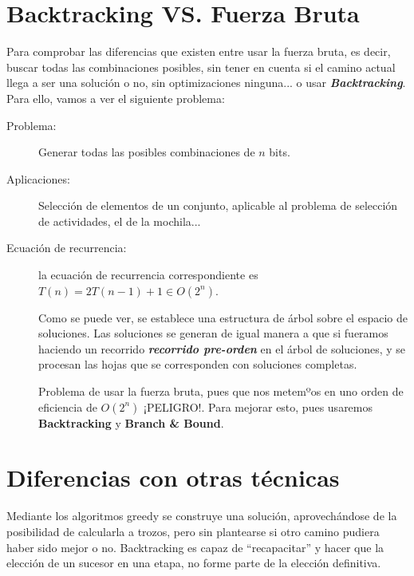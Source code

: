 \documentclass[10pt,a4paper,spanish]{report}
\theoremstyle{definition}
\theoremstyle{remark}
\begin{document}
\section{\textcolor{electricgreen}Backtracking VS. Fuerza Bruta}

Para comprobar las diferencias que existen entre usar la fuerza bruta, es decir, buscar todas las combinaciones posibles, sin tener en cuenta si el camino actual llega a ser una solución o no, sin optimizaciones ninguna... o usar \textbf{\textit{\textcolor{electricgreen}{Backtracking}}}. Para ello, vamos a ver el siguiente problema:

\begin{description}
    \item [Problema:] Generar todas las posibles combinaciones de $n$ bits.
    \item [Aplicaciones:] Selección de elementos de un conjunto, aplicable al problema de selección de actividades, el de la mochila...
    \item [Ecuación de recurrencia:] la ecuación de recurrencia correspondiente es $T(n)=2T(n-1)+1 \in O(2^n)$.
    \begin{center}
        
    \end{center}

    Como se puede ver, se establece una estructura de árbol sobre el espacio de soluciones. Las soluciones se generan de igual manera a que si fueramos haciendo un recorrido \textit{\textbf{\textcolor{electricgreen}{recorrido pre-orden}}} en el árbol de soluciones, y se procesan las hojas que se corresponden con soluciones completas.

    Problema de usar la fuerza bruta, pues que nos metemºos en uno orden de eficiencia de $O(2^n)$ ¡PELIGRO!. Para mejorar esto, pues usaremos \textbf{\textcolor{electricgreen}{Backtracking}} y \textbf{\textcolor{electricgreen}{Branch \& Bound}}.
\end{description}

\section{\textcolor{electricgreen}Diferencias con otras técnicas}

Mediante los algoritmos greedy se construye una solución, aprovechándose de la posibilidad de calcularla a trozos, pero sin plantearse si otro camino pudiera haber sido mejor o no. Backtracking es capaz de ``recapacitar'' y hacer que la elección de un sucesor en una etapa, no forme parte de la elección definitiva.
\end{document}
